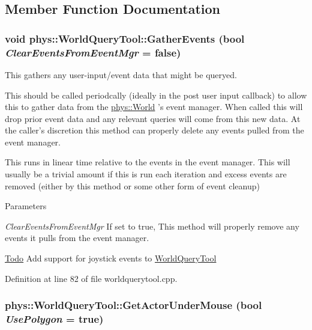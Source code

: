 \subsection{Member Function Documentation}
\hypertarget{classphys_1_1WorldQueryTool_ae387ff047f3cdf408d8959b8cbf4cc57}{
\subsubsection[{GatherEvents}]{\setlength{\rightskip}{0pt plus 5cm}void phys::WorldQueryTool::GatherEvents (bool {\em ClearEventsFromEventMgr} = {\ttfamily false})}}
\label{d8/d69/classphys_1_1WorldQueryTool_ae387ff047f3cdf408d8959b8cbf4cc57}


This gathers any user-\/input/event data that might be queryed. 

This should be called periodcally (ideally in the post user input callback) to allow this to gather data from the \hyperlink{classphys_1_1World}{phys::World} 's event manager. When called this will drop prior event data and any relevant queries will come from this new data. At the caller's discretion this method can properly delete any events pulled from the event manager. \par
 \par
 This runs in linear time relative to the events in the event manager. This will usually be a trivial amount if this is run each iteration and excess events are removed (either by this method or some other form of event cleanup) 
\begin{DoxyParams}{Parameters}
\item[{\em ClearEventsFromEventMgr}]If set to true, This method will properly remove any events it pulls from the event manager. \end{DoxyParams}


\begin{Desc}
\item[\hyperlink{todo__todo000021}{Todo}]Add support for joystick events to \hyperlink{classphys_1_1WorldQueryTool}{WorldQueryTool} \end{Desc}




Definition at line 82 of file worldquerytool.cpp.

\hypertarget{classphys_1_1WorldQueryTool_a2b1e95fb1ed9ceb7e26210c884c4a1db}{
\subsubsection[{GetActorUnderMouse}]{ phys::WorldQueryTool::GetActorUnderMouse (bool {\em UsePolygon} = {\ttfamily true})}}
\label{d8/d69/classphys_1_1WorldQueryTool_a2b1e95fb1ed9ceb7e26210c884c4a1db}

